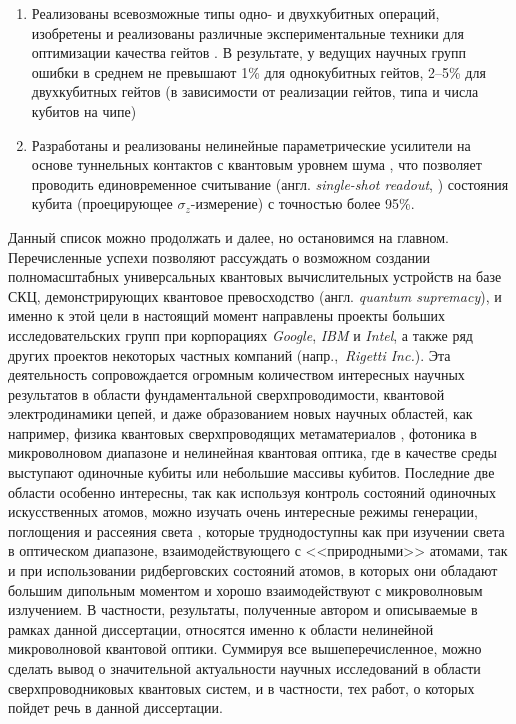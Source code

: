 \begin{enumerate}
	\item Реализованы всевозможные типы одно- и двухкубитных \cite{majer2007coupling} операций, изобретены и реализованы различные экспериментальные техники для оптимизации качества гейтов \cite{knill2008randomized, magesan2011scalable,motzoi2009simple}. В результате, у ведущих научных групп ошибки в среднем не превышают 1\% для однокубитных гейтов, 2--5\% для двухкубитных гейтов (в зависимости от реализации гейтов, типа и числа кубитов на чипе)
	\item Разработаны и реализованы нелинейные параметрические усилители на основе туннельных контактов с квантовым уровнем шума \cite{castellanos2007widely,macklin2015near}, что позволяет проводить единовременное считывание (англ. \textit{single-shot readout}, \cite{mallet2009single}) состояния кубита (проецирующее $\sigma_z$-измерение) с точностью более 95\%.
\end{enumerate}
Данный список можно продолжать и далее, но остановимся на главном. Перечисленные успехи позволяют рассуждать о возможном создании полномасштабных универсальных квантовых вычислительных устройств на базе СКЦ, демонстрирующих квантовое превосходство (англ. \textit{quantum supremacy}), и именно к этой цели в настоящий момент направлены проекты больших исследовательских групп при корпорациях \textit{Google}, \textit{IBM} и \textit{Intel}, а также ряд других проектов некоторых частных компаний (напр.,~\textit{Rigetti Inc.}). Эта деятельность сопровождается огромным количеством интересных научных результатов в области фундаментальной сверхпроводимости, квантовой электродинамики цепей, и даже образованием новых научных областей, как например, физика квантовых сверхпроводящих метаматериалов \cite{castellanos2008amplification,macha2014implementation,zagoskin2012superconducting}, фотоника в микроволновом диапазоне \cite{hofheinz2008generation-Fock-states,lang2013correlations,peng2016tuneable} и нелинейная квантовая оптика, где в качестве среды выступают одиночные кубиты или небольшие массивы кубитов. Последние две области особенно интересны, так как используя контроль состояний одиночных искусственных атомов, можно изучать очень интересные режимы генерации, поглощения и рассеяния света \cite{Toyli2016ResSqueez,Wallraff_entangledPhotons,Astafiev2010resonance}, которые труднодоступны как при изучении света в оптическом диапазоне, взаимодействующего с <<природными>> атомами, так и при использовании ридберговских состояний атомов, в которых они обладают большим дипольным моментом и хорошо взаимодействуют с микроволновым излучением. В частности, результаты, полученные автором и описываемые в рамках данной диссертации, относятся именно к области нелинейной микроволновой квантовой оптики. Суммируя все вышеперечисленное, можно сделать вывод о значительной актуальности научных исследований в области сверхпроводниковых квантовых систем, и в частности, тех работ, о которых пойдет речь в данной диссертации.

